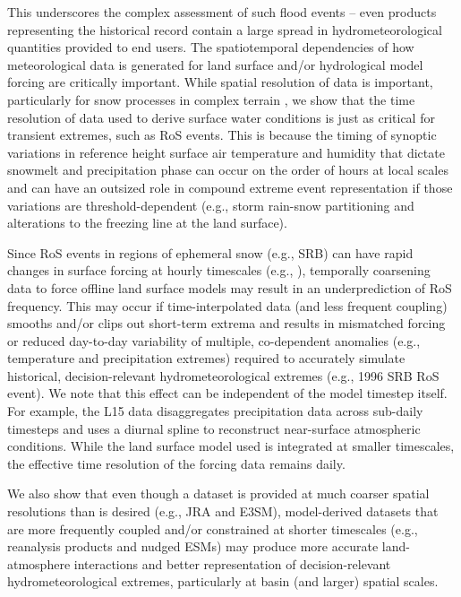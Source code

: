 \documentclass[nhess, manuscript]{copernicus}
\begin{document}

This underscores the complex assessment of such flood events -- even products representing the historical record contain a large spread in hydrometeorological quantities provided to end users. The spatiotemporal dependencies of how meteorological data is generated for land surface and/or hydrological model forcing are critically important.
While spatial resolution of data is important, particularly for snow processes in complex terrain \citep{henn2018an,Woodburn2021}, we show that the time resolution of data used to derive surface water conditions is just as critical for transient extremes, such as RoS events.
This is because the timing of synoptic variations in reference height surface air temperature and humidity that dictate snowmelt and precipitation phase can occur on the order of hours at local scales and can have an outsized role in compound extreme event representation if those variations are threshold-dependent (e.g., storm rain-snow partitioning and alterations to the freezing line at the land surface).

Since RoS events in regions of ephemeral snow (e.g., SRB) can have rapid changes in surface forcing at hourly timescales (e.g., \citet{leathers1998severe}), temporally coarsening data to force offline land surface models may result in an underprediction of RoS frequency.
This may occur if time-interpolated data (and less frequent coupling) smooths and/or clips out short-term extrema and results in mismatched forcing or reduced day-to-day variability of multiple, co-dependent anomalies (e.g., temperature and precipitation extremes) required to accurately simulate historical, decision-relevant hydrometeorological extremes (e.g., 1996 SRB RoS event). We note that this effect can be independent of the model timestep itself. For example, the L15 data disaggregates precipitation data across sub-daily timesteps and uses a diurnal spline to reconstruct near-surface atmospheric conditions. While the land surface model used is integrated at smaller timescales, the effective time resolution of the forcing data remains daily.

We also show that even though a dataset is provided at much coarser spatial resolutions than is desired (e.g., JRA and E3SM), model-derived datasets that are more frequently coupled and/or constrained at shorter timescales (e.g., reanalysis products and nudged ESMs) may produce more accurate land-atmosphere interactions and better representation of decision-relevant hydrometeorological extremes, particularly at basin (and larger) spatial scales.
\end{document}
